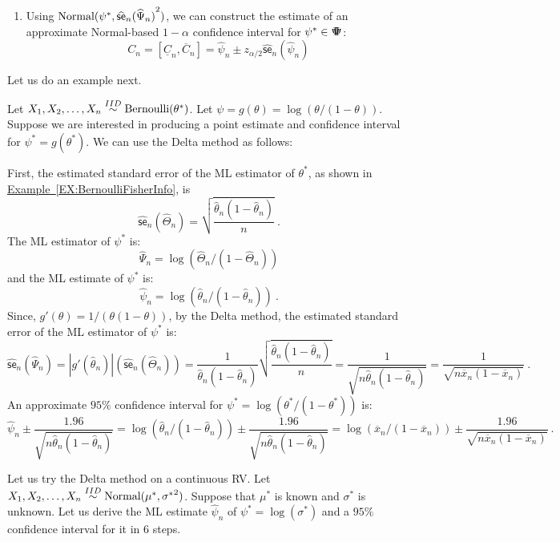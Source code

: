 {\begin{enumerate}
\[
\boxed{
\widehat{\mathsf{se}}_n(\widehat{\Psi}_n) = |g'(\widehat{\theta}_n)| \widehat{\mathsf{se}}_n(\widehat{\Theta}_n)
}
\]
\item Using $\mbox{{\rm Normal}}(\psi^*, {\widehat{\mathsf{se}}_n(\widehat{\Psi}_n)}^2)$, we can construct the estimate of an approximate Normal-based $1-\alpha$ confidence interval for $\psi^* \in {\Psi}\mspace{-11 mu}{\Psi}$:
\[
\boxed{
C_n  =[\underline{C}_n, \overline{C}_n]= \widehat{\psi}_n \pm z_{\alpha/2} {\widehat{\mathsf{se}}_n(\widehat{\psi}_n)}
}
\]
\end{enumerate}

Let us do an example next.
\begin{example}
Let $X_1,X_2,\ldots,X_n \overset{IID}{\sim} \mbox{{\rm Bernoulli}}(\theta^*)$.  Let $\psi=g(\theta)=\log(\theta/(1-\theta))$.  Suppose we are interested in producing a point estimate and confidence interval for $\psi^*=g(\theta^*)$.  We can use the Delta method as follows: 

First, the estimated standard error of the ML estimator of $\theta^*$, as shown in \hyperref[EX:BernoulliFisherInfo]{Example~\ref*{EX:BernoulliFisherInfo}}, is
\[
\widehat{\mathsf{se}}_n(\widehat{\Theta}_n) = \sqrt{\frac{\widehat{\theta}_n (1-\widehat{\theta}_n)}{n}} \ .
\]
The ML estimator of $\psi^*$ is:
$$\widehat{\Psi}_n=\log(\widehat{\Theta}_n / (1-\widehat{\Theta}_n))$$ 
and the ML estimate of $\psi^*$ is:
$$\widehat{\psi}_n=\log(\widehat{\theta}_n / (1-\widehat{\theta}_n)) \ .$$
Since, $g'(\theta) = 1/(\theta (1-\theta))$, by the Delta method, the estimated standard error of the ML estimator of $\psi^*$ is:
\[
\widehat{\mathsf{se}}_n(\widehat{\Psi}_n) = |g'(\widehat{\theta}_n)| (\widehat{\mathsf{se}}_n(\widehat{\Theta}_n))
= \frac{1}{\widehat{\theta}_n (1-\widehat{\theta}_n)} \sqrt{\frac{\widehat{\theta}_n (1-\widehat{\theta}_n)}{n}}
= \frac{1}{\sqrt{n\widehat{\theta}_n (1-\widehat{\theta}_n)}}
= \frac{1}{\sqrt{n \overline{x}_n (1-\overline{x}_n)}} \ .
\]
An approximate $95\%$ confidence interval for $\psi^*=\log(\theta^*/(1-\theta^*))$ is:
\[
\widehat{\psi}_n \pm \frac{1.96}{\sqrt{n \widehat{\theta}_n (1-\widehat{\theta}_n)}}
= \log(\widehat{\theta}_n / (1-\widehat{\theta}_n)) \pm \frac{1.96}{\sqrt{n \widehat{\theta}_n (1-\widehat{\theta}_n)}}
= \log(\overline{x}_n / (1-\overline{x}_n)) \pm \frac{1.96}{\sqrt{n \overline{x}_n (1-\overline{x}_n)}} \ .
\]
\end{example}

\begin{example}\label{EX:NormalDelta}
Let us try the Delta method on a continuous RV.  Let $X_1,X_2,\ldots,X_n \overset{IID}{\sim} \mbox{{\rm Normal}}(\mu^*, {\sigma^*}^2)$.  Suppose that $\mu^*$ is known and $\sigma^*$ is unknown.  Let us derive the ML estimate $\widehat{\psi}_n$ of $\psi^* = \log(\sigma^*)$ and a $95\%$ confidence interval for it in 6 steps.


\end{example}}
